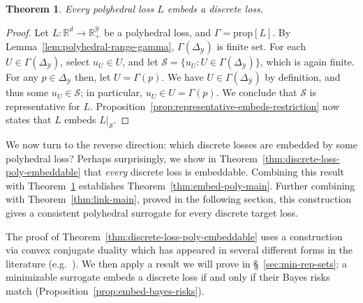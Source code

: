 \documentclass[11pt]{article}
\newcommand{\reals}{\mathbb{R}}
\newcommand{\prop}[1]{\mathrm{prop}[#1]}
\newcommand{\simplex}{\Delta_\Y}
\newcommand{\Sc}{\mathcal{S}}
\newcommand{\Y}{\mathcal{Y}}
\newtheorem{theorem}{Theorem}
\begin{document}
\begin{theorem}\label{thm:poly-embeds-discrete}
  Every polyhedral loss $L$ embeds a discrete loss.
\end{theorem}
\begin{proof}
  Let $L:\reals^d\to\reals_+^\Y$ be a polyhedral loss, and $\Gamma = \prop{L}$.
  By Lemma~\ref{lem:polyhedral-range-gamma}, $\Gamma(\simplex)$ is finite set. 
  For each $U\in \Gamma(\simplex)$, select $u_U \in U$, and let $\Sc = \{u_U : U \in\Gamma(\simplex)\}$, which is again finite.
  For any $p\in\simplex$ then, let $U = \Gamma(p)$.
  We have $U \in \Gamma(\simplex)$ by definition, and thus some $u_U \in \Sc$; in particular, $u_U \in U = \Gamma(p)$.
  We conclude that $\Sc$ is representative for $L$.
  Proposition~\ref{prop:representative-embeds-restriction} now states that $L$ embeds $L|_\Sc$.
\end{proof}

We now turn to the reverse direction: which discrete losses are embedded by some polyhedral loss?
Perhaps surprisingly, we show in Theorem~\ref{thm:discrete-loss-poly-embeddable} that \emph{every} discrete loss is embeddable.
Combining this result with Theorem~\ref{thm:poly-embeds-discrete} establishes Theorem~\ref{thm:embed-poly-main}.
Further combining with Theorem~\ref{thm:link-main}, proved in the following section, this construction gives a consistent polyhedral surrogate for every discrete target loss.

The proof of Theorem~\ref{thm:discrete-loss-poly-embeddable} uses a construction via convex conjugate duality which has appeared in several different forms in the literature (e.g.\ \cite{duchi2018multiclass,abernethy2013efficient,frongillo2014general}).
We then apply a result we will prove in \S~\ref{sec:min-rep-sets}: a minimizable surrogate embeds a discrete loss if and only if their Bayes risks match (Proposition~\ref{prop:embed-bayes-risks}).
\end{document}
